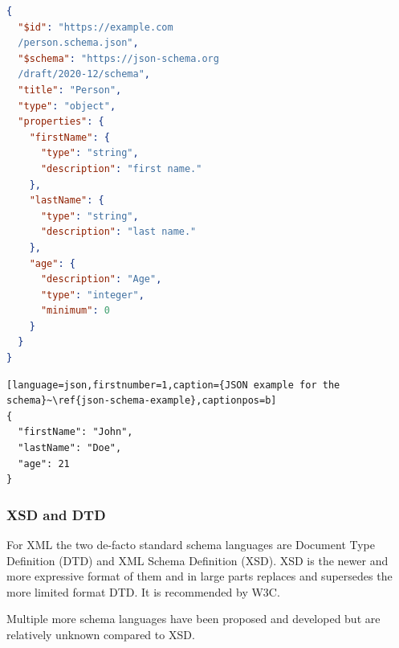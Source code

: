 \begin{lstlisting}[language=json,firstnumber=1,caption={JSON schema example},captionpos=b]
{
  "$id": "https://example.com
  /person.schema.json",
  "$schema": "https://json-schema.org
  /draft/2020-12/schema",
  "title": "Person",
  "type": "object",
  "properties": {
    "firstName": {
      "type": "string",
      "description": "first name."
    },
    "lastName": {
      "type": "string",
      "description": "last name."
    },
    "age": {
      "description": "Age",
      "type": "integer",
      "minimum": 0
    }
  }
}
\end{lstlisting}\label{json-schema-example}


\begin{lstlisting}[language=json,firstnumber=1,caption={JSON example for the schema}~\ref{json-schema-example},captionpos=b]
{
  "firstName": "John",
  "lastName": "Doe",
  "age": 21
}
\end{lstlisting}\label{json-example}

\subsubsection{XSD and DTD}
For XML the two de-facto standard schema languages are Document Type Definition (DTD)\cite{dtd_spec} and XML Schema Definition (XSD)\cite{xsd_spec}.
XSD is the newer and more expressive format of them and in large parts replaces and supersedes the more limited format DTD\cite{dtd_vs_xsd}.
It is recommended by W3C\cite{xsd_spec}.

Multiple more schema languages have been proposed and developed but are relatively unknown compared to XSD\cite{xml_schemas_1,xml_schemas_2}.

